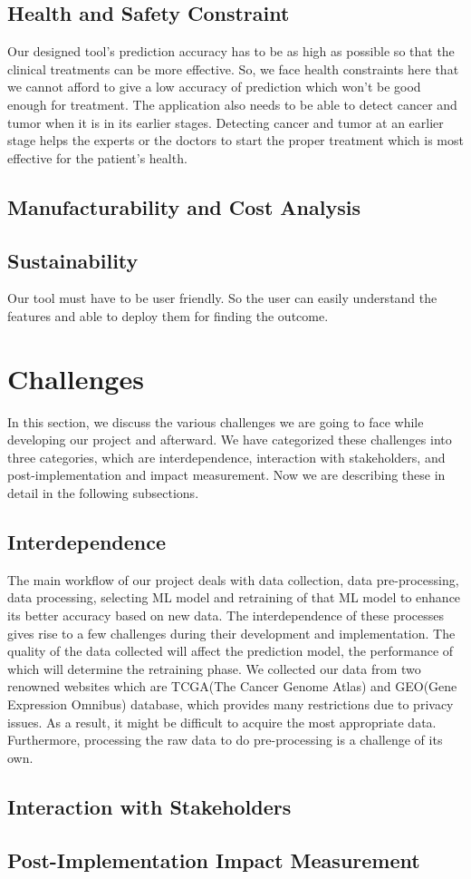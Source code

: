\subsection{Health and Safety Constraint}
Our designed tool’s prediction accuracy has to be as high as possible so that the clinical treatments can be more effective. So, we face health constraints here that we cannot afford to give a low accuracy of prediction which won’t be good enough for treatment. The application also needs to be able to detect cancer and tumor when it is in its earlier stages. Detecting cancer and tumor at an earlier stage helps the experts or the doctors to start the proper treatment which is most effective for the patient’s health.
\subsection{Manufacturability and Cost Analysis}
\subsection{Sustainability}
Our tool must have to be user friendly. So the user can easily understand the features and able to deploy them for finding the outcome.

\section{Challenges}
In this section, we discuss the various challenges we are going to face while developing our
project and afterward. We have categorized these challenges into three categories, which are
interdependence, interaction with stakeholders, and post-implementation and impact measurement. Now we are describing these in detail in the following subsections.

\subsection{Interdependence}
The main workflow of our project deals with data collection, data pre-processing, data processing, selecting ML model and retraining of that ML model to enhance its better accuracy based on new data. The interdependence of these processes gives rise to a few challenges during their development and implementation. The quality of the data collected will affect the prediction model, the performance of which will determine the retraining phase. We collected our data from two renowned websites which are TCGA(The Cancer Genome Atlas) and GEO(Gene Expression Omnibus) database, which provides many restrictions due to privacy issues. As a result, it might be difficult to acquire the most appropriate data. Furthermore, processing the raw data to do pre-processing is a challenge of its own.


\subsection{Interaction with Stakeholders}
\subsection{Post-Implementation Impact Measurement}